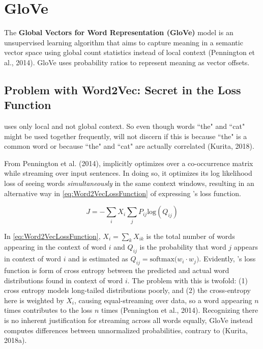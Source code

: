 \section{GloVe} \label{sec:Glove}

The \textbf{Global Vectors for Word Representation (GloVe)} model is an unsupervised learning algorithm that aims to capture meaning in a semantic vector space using global count statistics instead of local context (Pennington et al., 2014). GloVe uses probability ratios to represent meaning as vector offsets. 



\subsection{Problem with Word2Vec: Secret in the Loss Function} \label{sec:ProblemWord2VecFromGloveStandpoint}

 uses only local and not global context. So even though words ``the" and ``cat" might be used together frequently,  will not discern if this is because ``the" is a common word or because ``the" and ``cat" are actually correlated (Kurita, 2018). 

From Pennington et al. (2014),  implicitly optimizes over a co-occurrence matrix while streaming over input sentences. In doing so, it optimizes its log likelihood loss of seeing words \emph{simultaneously} in the same context windows, resulting in an alternative way in \cref{eq:Word2VecLossFunction} of expressing 's loss function. 

\begin{equation} 
J = - \sum_i X_i \sum_j P_{ij} \text{log}(Q_{ij}) 
\label{eq:Word2VecLossFunction}
\end{equation} 

In \cref{eq:Word2VecLossFunction}, $X_i = \sum_k X_{ik}$ is the total number of words appearing in the context of word $i$ and $Q_{ij}$ is the probability that word $j$ appears in context of word $i$ and is estimated as $Q_{ij} = \text{softmax} \Big( w_i \cdot w_j \Big)$. Evidently, 's loss function is form of cross entropy between the predicted and actual word distributions found in context of word $i$. The problem with this is twofold: (1) cross entropy models long-tailed distributions poorly, and (2) the cross-entropy here is weighted by $X_i$, causing equal-streaming over data, so a word appearing $n$ times contributes to the loss $n$ times (Pennington et al., 2014). Recognizing there is no inherent justification for streaming across all words equally, GloVe instead computes differences between unnormalized probabilities, contrary to  (Kurita, 2018a). 


